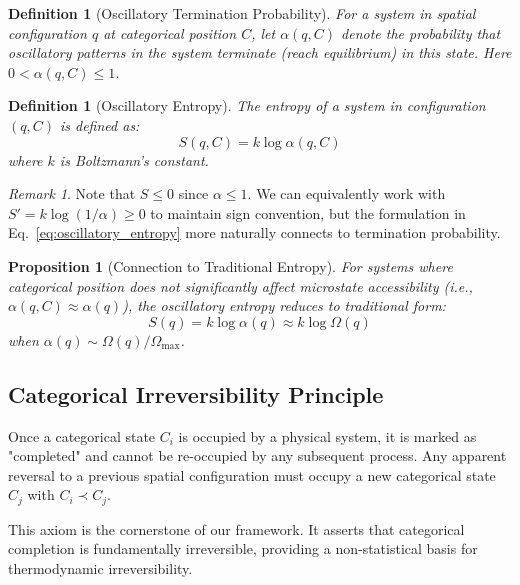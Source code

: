 \documentclass[12pt,a4paper]{article}
\newtheorem{definition}[theorem]{Definition}
\newtheorem{proposition}[theorem]{Proposition}
\theoremstyle{remark}
\newtheorem{remark}[theorem]{Remark}
\begin{document}
\begin{definition}[Oscillatory Termination Probability]
For a system in spatial configuration $q$ at categorical position $C$, let $\alpha(q, C)$ denote the probability that oscillatory patterns in the system terminate (reach equilibrium) in this state. Here $0 < \alpha(q, C) \leq 1$.
\end{definition}

\begin{definition}[Oscillatory Entropy]
The entropy of a system in configuration $(q, C)$ is defined as:
\begin{equation}
S(q, C) = k \log \alpha(q, C)
\label{eq:oscillatory_entropy}
\end{equation}
where $k$ is Boltzmann's constant.
\end{definition}

\begin{remark}
Note that $S \leq 0$ since $\alpha \leq 1$. We can equivalently work with $S' = k \log(1/\alpha) \geq 0$ to maintain sign convention, but the formulation in Eq.~\eqref{eq:oscillatory_entropy} more naturally connects to termination probability.
\end{remark}

\begin{proposition}[Connection to Traditional Entropy]
For systems where categorical position does not significantly affect microstate accessibility (i.e., $\alpha(q, C) \approx \alpha(q)$), the oscillatory entropy reduces to traditional form:
\begin{equation}
S(q) = k \log \alpha(q) \approx k \log \Omega(q)
\end{equation}
when $\alpha(q) \sim \Omega(q)/\Omega_\text{max}$.
\end{proposition}

\subsection{Categorical Irreversibility Principle}

\begin{axiom}
\label{axiom:irreversibility}
Once a categorical state $C_i$ is occupied by a physical system, it is marked as "completed" and cannot be re-occupied by any subsequent process. Any apparent reversal to a previous spatial configuration must occupy a new categorical state $C_j$ with $C_i \prec C_j$.
\end{axiom}

This axiom is the cornerstone of our framework. It asserts that categorical completion is fundamentally irreversible, providing a non-statistical basis for thermodynamic irreversibility.
\end{document}
